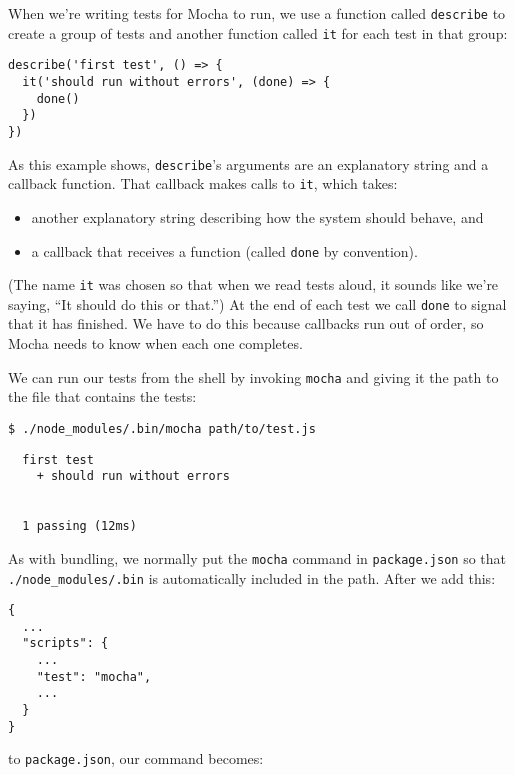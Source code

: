 When we're writing tests for Mocha to run,
we use a function called \texttt{describe} to create a group of tests
and another function called \texttt{it} for each test in that group:

\begin{verbatim}
describe('first test', () => {
  it('should run without errors', (done) => {
    done()
  })
})
\end{verbatim}

\noindent
As this example shows,
\texttt{describe}'s arguments are an explanatory string and a callback function.
That callback makes calls to \texttt{it}, which takes:

\begin{itemize}
\item
  another explanatory string describing how the system should behave, and
\item
  a callback that receives a function (called \texttt{done} by convention).
\end{itemize}

\noindent
(The name \texttt{it} was chosen so that when we read tests aloud,
it sounds like we're saying, ``It should do this or that.'')
At the end of each test we call \texttt{done} to signal that it has finished.
We have to do this because callbacks run out of order,
so Mocha needs to know when each one completes.

We can run our tests from the shell by invoking \texttt{mocha}
and giving it the path to the file that contains the tests:

\begin{verbatim}
$ ./node_modules/.bin/mocha path/to/test.js
\end{verbatim}

\begin{verbatim}
  first test
    + should run without errors


  1 passing (12ms)
\end{verbatim}

As with bundling,
we normally put the \texttt{mocha} command in \texttt{package.json}
so that \texttt{./node\_modules/.bin} is automatically included in the path.
After we add this:

\begin{verbatim}
{
  ...
  "scripts": {
    ...
    "test": "mocha",
    ...
  }
}
\end{verbatim}

\noindent
to \texttt{package.json}, our command becomes:

